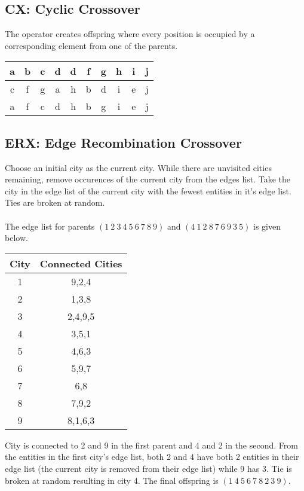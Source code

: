 \documentclass[../main.tex]{subfiles}
\begin{document}
\subsection{CX: Cyclic Crossover}
The operator creates offspring where every position is occupied by a corresponding element from one of the parents.
\begin{table}[H]
    \centering
    \begin{tabular}{|c|c|c|c|c|c|c|c|c|c|}
        \hline
        \cellcolor{black!25}a & b & \cellcolor{black!10}c & \cellcolor{black!10}d & d & f & \cellcolor{black!10}g & h & i & j \\ \hline
        \cellcolor{black!10}c & f & \cellcolor{black!10}g & a & h & b & \cellcolor{black!10}d & i & e & j \\ \hline
        \hline
        \cellcolor{black!10}a & f & \cellcolor{black!10}c & \cellcolor{black!10}d & h & b & \cellcolor{black!10}g & i & e & j \\ \hline
    \end{tabular}
\end{table}

\subsection{ERX: Edge Recombination Crossover}
Choose an initial city as the current city. While there are unvisited cities remaining, remove occurences of the current city from the edges list. Take the city in the edge list of the current city with the fewest entities in it's edge list. Ties are broken at random.
\\\\
The edge list for parents $(1 ~ 2 ~ 3 ~ 4 ~ 5 ~ 6 ~ 7 ~ 8 ~ 9)$ and $(4 ~ 1 ~ 2 ~ 8 ~ 7 ~ 6 ~ 9 ~ 3 ~ 5)$ is given below.

\begin{table}[H]
    \centering
    \begin{tabular}{cc}
    \toprule
    City & Connected Cities \\
    \midrule
    1 & 9,2,4 \\
    2 & 1,3,8 \\
    3 & 2,4,9,5 \\
    4 & 3,5,1 \\
    5 & 4,6,3 \\
    6 & 5,9,7 \\
    7 & 6,8 \\
    8 & 7,9,2 \\
    9 & 8,1,6,3 \\
    \bottomrule
    \end{tabular}
\end{table}
City is connected to 2 and 9 in the first parent and 4 and 2 in the second. From the entities in the first city's edge list, both 2 and 4 have both 2 entities in their edge list (the current city is removed from their edge list) while 9 has 3. Tie is broken at random resulting in city 4. The final offspring is $(1 ~ 4 ~5 ~6 ~7 ~8 ~2 ~3 ~9)$.
\end{document}

